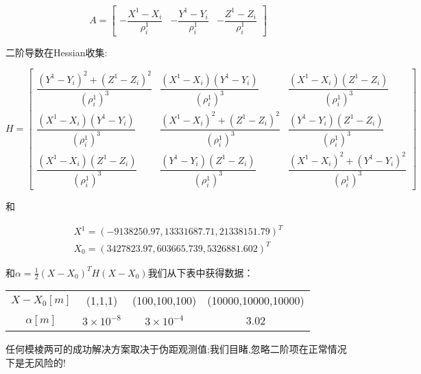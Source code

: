 		\begin{equation}\label{eq:9.30}

			A=\begin{bmatrix}

			-\dfrac{X^1-X_i}{\rho^1_i} & -\dfrac{Y^1-Y_i}{\rho^1_i} & -\dfrac{Z^1-Z_i}{\rho^1_i}

			\end{bmatrix}

		\end{equation}

	二阶导数在Hessian收集:

		\begin{equation}\label{eq:9.31}

			H=

			\begin{bmatrix}

				\dfrac{(Y^1-Y_i)^2+(Z^1-Z_i)^2}{(\rho^1_i)^3} & \dfrac{(X^1-X_i)(Y^1-Y_i)}{(\rho^1_i)^3} 		& \dfrac{(X^1-X_i)(Z^1-Z_i)}{(\rho^1_i)^3} \\

				\dfrac{(X^1-X_i)(Y^1-Y_i)}{(\rho^1_i)^3}       & \dfrac{(X^1-X_i)^2+(Z^1-Z_i)^2}{(\rho^1_i)^3}   & \dfrac{(Y^1-Y_i)(Z^1-Z_i)}{(\rho^1_i)^3} \\

				\dfrac{(X^1-X_i)(Z^1-Z_i)}{(\rho^1_i)^3} 	  & \dfrac{(Y^1-Y_i)(Z^1-Z_i)}{(\rho^1_i)^3} 		& \dfrac{(X^1-X_i)^2+(Y^1-Y_i)^2}{(\rho^1_i)^3}		

			\end{bmatrix}

		\end{equation}

	和

		\[

		\begin{split}

		X^1=(-9138250.97,13331687.71,21338151.79)^T \\

		X_0=(3427823.97,603665.739,5326881.602)^T

		\end{split}

		\]

	和$\alpha=\frac{1}{2}(X-X_0)^TH(X-X_0)$我们从下表中获得数据：
		\begin{table}

			\begin{tabular}{cccc}

				\hline

				$X-X_0[m]$ & (1,1,1) & (100,100,100) & (10000,10000,10000) \\ 

				$\alpha [m]$ & $3\times10^{-8}$ & $3\times10^{-4}$ & 3.02 \\ 

				\hline

			\end{tabular} 

		\end{table}

	任何模棱两可的成功解决方案取决于伪距观测值;我们目睹,忽略二阶项在正常情况下是无风险的!

			

